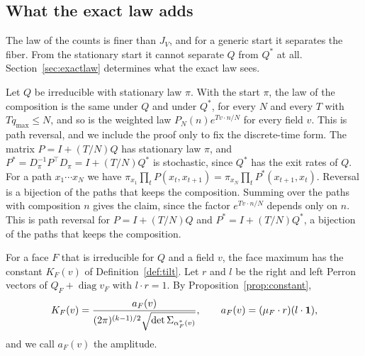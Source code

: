 \subsection{What the exact law adds}\label{sec:stationary}

The law of the counts is finer than $J_V$, and for a generic start it separates the fiber.
From the stationary start it cannot separate $Q$ from $Q^*$ at all. Section~\ref{sec:exactlaw}
determines what the exact law sees.

\begin{remark}\label{rem:stationary}
Let $Q$ be irreducible with stationary law $\pi$. With the start $\pi$, the law of the
composition is the same under $Q$ and under $Q^*$, for every $N$ and every $T$ with
$Tq_{\max}\le N$, and so is the weighted law $P_N(n)e^{Tv\cdot n/N}$ for every field $v$. \ifarxivbuild
This is
path reversal, and we include the proof only to fix the discrete-time form. The matrix $P=I+(T/N)Q$ has stationary law $\pi$, and $P^*=D_\pi^{-1}P^\top D_\pi=I+(T/N)Q^*$
is stochastic, since $Q^*$ has the exit rates of $Q$. For a path $x_1\cdots x_N$ we have
$\pi_{x_1}\prod_tP(x_t,x_{t+1})=\pi_{x_N}\prod_tP^*(x_{t+1},x_t)$. Reversal is a bijection of
the paths that keeps the composition. Summing over the paths with composition $n$ gives the
claim, since the factor $e^{Tv\cdot n/N}$ depends only on $n$.
\else
This is
path reversal for $P=I+(T/N)Q$ and $P^*=I+(T/N)Q^*$, a bijection of the paths that keeps the
composition.
\fi
\end{remark}

For a face $F$ that is irreducible for $Q$ and a field $v$, the face maximum has the constant
$K_F(v)$ of Definition~\ref{def:tilt}. Let $r$ and $l$ be the right and left Perron vectors of
$Q_F+\operatorname{diag}v_F$ with $l\cdot r=1$. By Proposition~\ref{prop:constant},
\begin{equation}\label{eq:amplitude}
 K_F(v)=\frac{a_F(v)}{(2\pi)^{(k-1)/2}\sqrt{\det\Sigma_{\alpha^*_F(v)}}},\qquad
 a_F(v)=(\mu_F\cdot r)(l\cdot\mathbf{1}),
\end{equation}
and we call $a_F(v)$ the amplitude.


